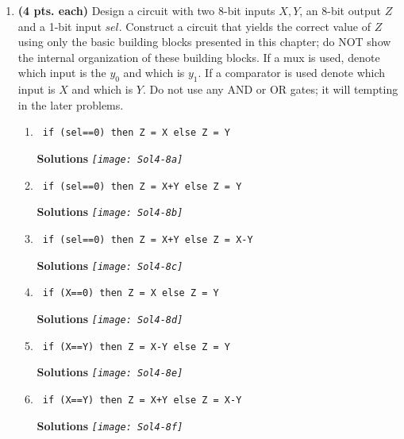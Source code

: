 \begin{enumerate}
\item \textbf{ (4 pts. each)} Design a circuit with two 8-bit inputs $X,Y$, an 
8-bit output $Z$ and a 1-bit input $sel$.  Construct a circuit that yields the 
correct value of $Z$ using only the basic building blocks presented in this 
chapter; do NOT show the internal organization of these building blocks.  If 
a mux is used, denote which input is the $y_0$ and which is $y_1$.  
If a comparator is used denote which input is $X$ and which is $Y$.
Do not use any AND or OR gates; it will tempting in the later problems.
\begin{enumerate}
\item \verb^ if (sel==0) then Z = X else Z = Y ^

\begin{onlysolution} \textbf{Solutions} \itshape{ 
\texttt{[image: Sol4-8a]}
} \end{onlysolution} 

\item \verb^ if (sel==0) then Z = X+Y else Z = Y ^

\begin{onlysolution} \textbf{Solutions} \itshape{ 
\texttt{[image: Sol4-8b]}
} \end{onlysolution} 

\item \verb^ if (sel==0) then Z = X+Y else Z = X-Y ^

\begin{onlysolution} \textbf{Solutions} \itshape{
\texttt{[image: Sol4-8c]}
} \end{onlysolution} 

\item \verb^ if (X==0) then Z = X else Z = Y ^

\begin{onlysolution} \textbf{Solutions} \itshape{
\texttt{[image: Sol4-8d]}
} \end{onlysolution} 

\item \verb^ if (X==Y) then Z = X-Y else Z = Y ^

\begin{onlysolution} \textbf{Solutions} \itshape{
\texttt{[image: Sol4-8e]}
} \end{onlysolution} 

\item \verb^ if (X==Y) then Z = X+Y else Z = X-Y ^

\begin{onlysolution} \textbf{Solutions} \itshape{
\texttt{[image: Sol4-8f]}
} \end{onlysolution} 


\end{enumerate}
\end{enumerate}
